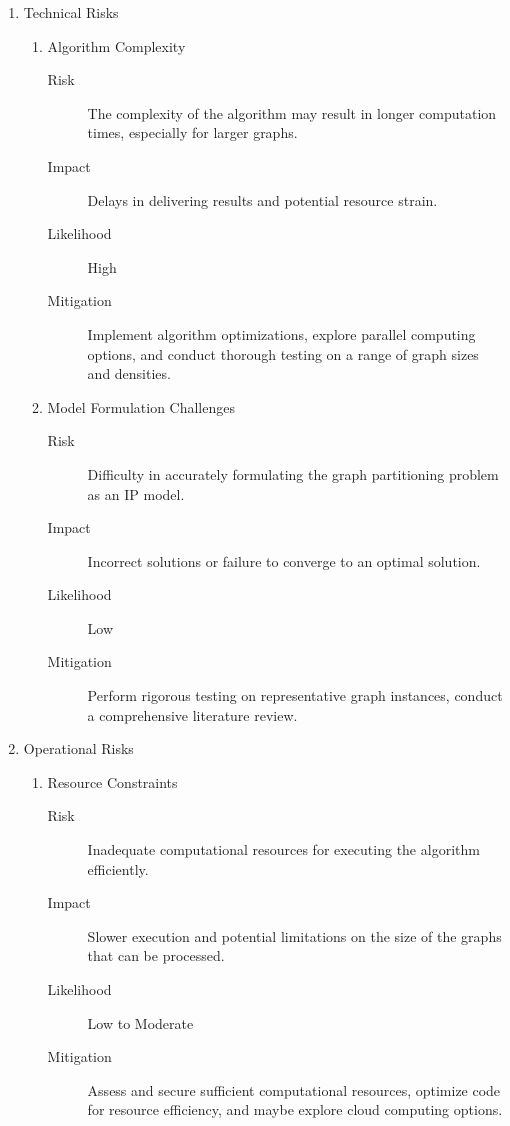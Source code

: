 \documentclass[a4paper,12pt]{report}
\begin{document}
\begin{enumerate}
	\item Technical Risks

		\begin{enumerate}
			\item Algorithm Complexity

				\begin{description}
					\item[Risk] The complexity of the algorithm may result in longer computation times, especially for larger graphs.
					\item [Impact] Delays in delivering results and potential resource strain.
					\item[Likelihood] High
					\item[Mitigation] Implement algorithm optimizations, explore parallel computing options, and conduct thorough testing on a range of graph sizes and densities.
				\end{description}

			\item Model Formulation Challenges

				\begin{description}
					\item[Risk] Difficulty in accurately formulating the graph partitioning problem as an IP model.
					\item[Impact] Incorrect solutions or failure to converge to an optimal solution.
					\item[Likelihood] Low
					\item[Mitigation] Perform rigorous testing on representative graph instances, conduct a comprehensive literature review.
				\end{description}
		\end{enumerate}

	\item Operational Risks

		\begin{enumerate}
			\item Resource Constraints

				\begin{description}
					\item[Risk] Inadequate computational resources for executing the algorithm efficiently.
					\item[Impact] Slower execution and potential limitations on the size of the graphs that can be processed.
					\item[Likelihood] Low to Moderate
					\item[Mitigation] Assess and secure sufficient computational resources, optimize code for resource efficiency, and maybe explore cloud computing options.
				\end{description}


\end{enumerate}
\end{enumerate}
\end{document}
